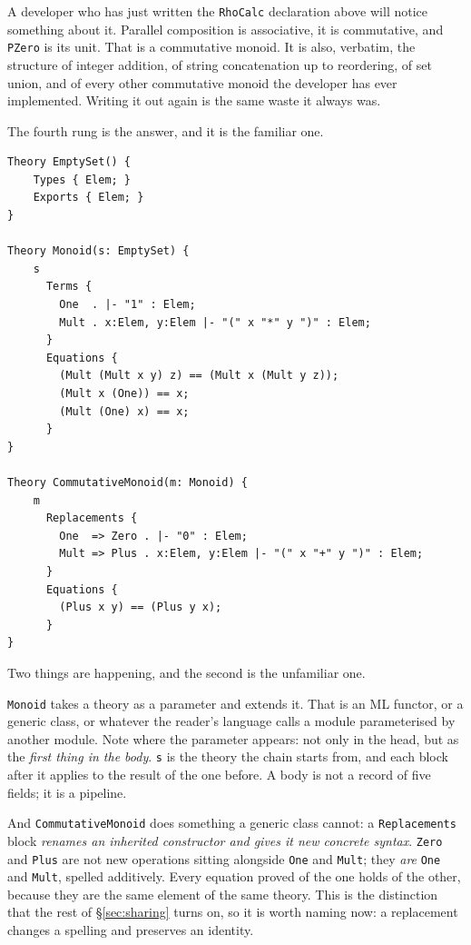 A developer who has just written the \texttt{RhoCalc} declaration above will
notice something about it. Parallel composition is associative, it is
commutative, and \texttt{PZero} is its unit. That is a commutative monoid. It is
also, verbatim, the structure of integer addition, of string concatenation up to
reordering, of set union, and of every other commutative monoid the developer
has ever implemented. Writing it out again is the same waste it always was.

The fourth rung is the answer, and it is the familiar one.

\begin{lstlisting}[language=mettail]
Theory EmptySet() {
    Types { Elem; }
    Exports { Elem; }
}

Theory Monoid(s: EmptySet) {
    s
      Terms {
        One  . |- "1" : Elem;
        Mult . x:Elem, y:Elem |- "(" x "*" y ")" : Elem;
      }
      Equations {
        (Mult (Mult x y) z) == (Mult x (Mult y z));
        (Mult x (One)) == x;
        (Mult (One) x) == x;
      }
}

Theory CommutativeMonoid(m: Monoid) {
    m
      Replacements {
        One  => Zero . |- "0" : Elem;
        Mult => Plus . x:Elem, y:Elem |- "(" x "+" y ")" : Elem;
      }
      Equations {
        (Plus x y) == (Plus y x);
      }
}
\end{lstlisting}

Two things are happening, and the second is the unfamiliar one.

\texttt{Monoid} takes a theory as a parameter and extends it. That is an ML
functor, or a generic class, or whatever the reader's language calls a module
parameterised by another module. Note where the parameter appears: not only in
the head, but as the \emph{first thing in the body}. \texttt{s} is the theory the
chain starts from, and each block after it applies to the result of the one
before. A body is not a record of five fields; it is a pipeline.

And \texttt{CommutativeMonoid} does something a generic class cannot: a
\texttt{Replacements} block \emph{renames an inherited constructor and gives it
new concrete syntax}. \texttt{Zero} and \texttt{Plus} are not new operations
sitting alongside \texttt{One} and \texttt{Mult}; they \emph{are} \texttt{One}
and \texttt{Mult}, spelled additively. Every equation proved of the one holds of
the other, because they are the same element of the same theory. This is the
distinction that the rest of \S\ref{sec:sharing} turns on, so it is worth
naming now: a replacement changes a spelling and preserves an identity.

